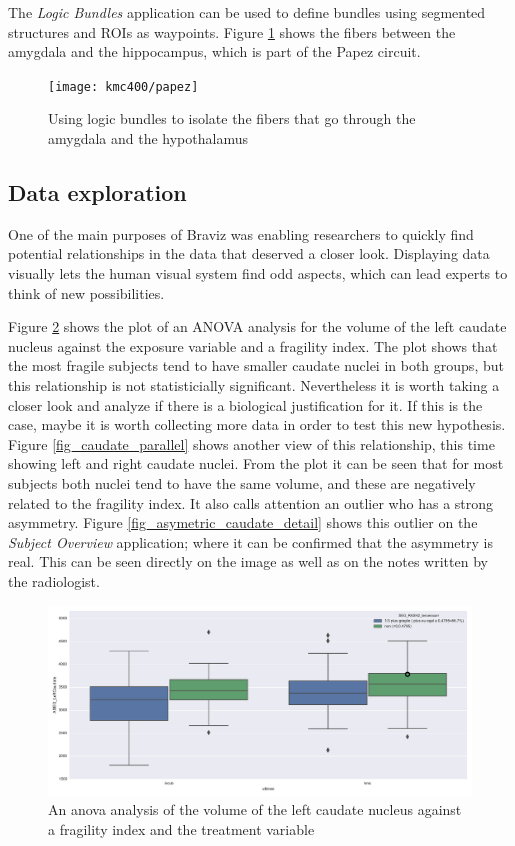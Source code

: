The \emph{Logic Bundles} application can be used to define bundles using segmented structures and ROIs as waypoints. Figure \ref{fig_papez} shows the fibers between the amygdala and the hippocampus, which is part of the Papez circuit. 

\begin{figure}
\centering
\texttt{[image: kmc400/papez]}
\caption{Using logic bundles to isolate the fibers that go through the amygdala and the hypothalamus
\label{fig_papez}}
\end{figure} 




\subsection{Data exploration}

One of the main purposes of Braviz was enabling researchers to quickly find potential relationships in the data that deserved a closer look. Displaying data visually lets the human visual system find odd aspects, which can lead experts to think of new possibilities. 

Figure \ref{fig_anova_example} shows the plot of an ANOVA analysis for the volume of the left caudate nucleus against the exposure variable and a fragility index. The plot shows that the most fragile subjects tend to have smaller caudate nuclei in both groups, but this relationship is not statisticially significant. Nevertheless it is worth taking a closer look and analyze if there is a biological justification for it. If this is the case, maybe it is worth collecting more data in order to test this new hypothesis. Figure \ref{fig_caudate_parallel} shows another view of this relationship, this time showing left and right caudate nuclei. From the plot it can be seen that for most subjects both nuclei tend to have the same volume, and these are negatively related to the fragility index. It also calls attention an outlier who has a strong asymmetry. Figure \ref{fig_asymetric_caudate_detail} shows this outlier on the \emph{Subject Overview} application; where it can be confirmed that the asymmetry is real. This can be seen directly on the image as well as on the notes written by the radiologist.


\begin{figure}
	\centering
		\includegraphics[width=\textwidth]{figures/kmc400/left_caudate_fragility_anova}
	\caption{An anova analysis of the volume of the left caudate nucleus against a fragility index and the treatment variable}
	\label{fig_anova_example}
\end{figure}


